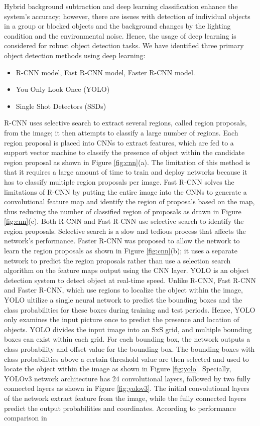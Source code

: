 Hybrid background subtraction and deep learning classification enhance the system’s accuracy; however, there are issues with detection of individual objects in a group or blocked objects and the background changes by the lighting condition and the environmental noise. Hence, the usage of deep learning is considered for robust object detection tasks. We have identified three primary object detection methods using deep learning:
\begin{itemize}
\item R-CNN model, Fast R-CNN model, Faster R-CNN model.
\item You Only Look Once (YOLO)
\item Single Shot Detectors (SSDs) 
\end{itemize}
R-CNN \cite{girshick2014rich} uses selective search \cite{uijlings2013selective} to extract several regions, called region proposals, from the image; it then attempts to classify a large number of regions. Each region proposal is placed into CNNs to extract features, which are fed to a support vector machine to classify the presence of object within the candidate region proposal as shown in Figure \ref{fig:cnn}(a). The limitation of this method is that it requires a large amount of time to train and deploy networks because it has to classify multiple region proposals per image. Fast R-CNN \cite{girshick2015fast} solves the limitations of R-CNN by putting the entire image into the CNNs to generate a convolutional feature map and identify the region of proposals based on the map, thus reducing the number of classified region of proposals as drawn in Figure \ref{fig:cnn}(c). Both R-CNN and Fast R-CNN use selective search to identify the region proposals. Selective search is a slow and tedious process that affects the network’s performance. Faster R-CNN \cite{ren2015faster} was proposed to allow the network to learn the region proposals as shown in Figure \ref{fig:cnn}(b); it uses a separate network to predict the region proposals rather than use a selection search algorithm on the feature maps output using the CNN layer. YOLO \cite{redmon2016you} is an object detection system to detect object at real-time speed. Unlike R-CNN, Fast R-CNN and Faster R-CNN, which use regions to localize the object within the image, YOLO ultilize a single neural network to predict the bounding boxes and the class probabilities for these boxes during training and test periods. Hence, YOLO only examines the input picture once to predict the presence and location of objects. YOLO divides the input image into an SxS grid, and multiple bounding boxes can exist within each grid. For each bounding box, the network outputs a class probability and offset value for the bounding box. The bounding boxes with class probabilities above a certain threshold value are then selected and used to locate the object within the image as shown in Figure \ref{fig:yolo}. Specially, YOLOv3 network architecture has 24 convolutional layers, followed by two fully connected layers as shown in Figure \ref{fig:yolov3}. The initial convolutional layers of the network extract feature from the image, while the fully connected layers predict the output probabilities and coordinates. According to performance comparison in 